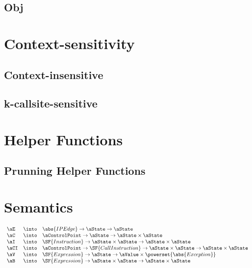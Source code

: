 \subsection{Obj}

\newpage
\section{Context-sensitivity}
\subsection{Context-insensitive}
\subsection{k-callsite-sensitive}

\newpage
\section{Helper Functions}

\subsection{Prunning Helper Functions}

\newpage
\section{Semantics}
\[
\begin{array}{lcl}
\aE & \into & \abs{IPEdge} \rightarrow \aState \rightarrow \aState \\
\aC & \into & \aControlPoint \rightarrow \aState \rightarrow \aState \times \aState\\
\aI & \into & \SF{Instruction}
    \rightarrow \aState \times \aState \rightarrow \aState \times \aState\\
\aCI & \into & \aControlPoint \rightarrow \SF{CallInstruction}
    \rightarrow \aState \times \aState \rightarrow \aState \times \aState\\
\aV & \into & \SF{Expression} \rightarrow \aState
    \rightarrow \aValue \times \powerset{\abs{Exception}} \\
\aB & \into & \SF{Expression} \rightarrow \aState \times \aState
    \rightarrow \aState \times \aState\\
\end{array}
\]

